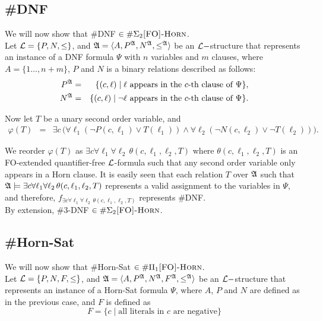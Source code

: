 \subsection{{\sc \#DNF}}
We will now show that {\sc \#DNF} $\in\#\Sigma_2\textsc{[FO]-Horn}$.\\

Let ${\cal L} = \{P,N,\leq\}$, and ${\frak A} = \langle A, P^{\frak A}, N^{\frak A}, \leq^{\frak A} \rangle$ be an ${\cal L}-$structure that represents an instance of a {\sc DNF} formula $\Psi$ with $n$ variables and $m$ clauses, where $A = \{1\ldots,n+m\}$, $P$ and $N$ is a binary relations described as follows:
\begin{eqnarray*}
P^{\frak A} &=& \{(c,\ell)\mid \ell \mbox{ appears in the $c$-th clause of }\Psi\},\\
N^{\frak A} &=& \{(c,\ell)\mid \neg \ell \mbox{ appears in the $c$-th clause of }\Psi\}.
\end{eqnarray*}

Now let $T$ be a unary second order variable, and
\begin{eqnarray*}
\varphi(T) &=& \exists c \,\Big(\forall \ell_1 (\neg P(c,\ell_1) \vee T(\ell_1)) \wedge \forall \ell_2 (\neg N(c,\ell_2) \vee \neg T(\ell_2))\Big). 
\end{eqnarray*}

We reorder $\varphi(T)$ as $\exists c \forall \ell_1 \forall \ell_2\, \theta(c,\ell_1,\ell_2,T)$ where $\theta(c,\ell_1,\ell_2,T)$ is an {\sc FO}-extended quantifier-free ${\cal L}$-formula such that any second order variable only appears in a Horn clause. It is easily seen that each relation $T$ over ${\frak A}$ such that ${\frak A}\models \exists c \forall \ell_1 \forall \ell_2\, \theta(c,\ell_1,\ell_2,T)$ represents a valid assignment to the variables in $\Psi$, and therefore, $f_{\exists c \forall \ell_1 \forall \ell_2\, \theta(c,\ell_1,\ell_2,T)}$ represents {\sc \#DNF}.\\

By extension, {\sc \#3-DNF} $\in\#\Sigma_2\textsc{[FO]-Horn}$.

\subsection{{\sc \#Horn-Sat}}
We will now show that {\sc \#Horn-Sat} $\in\#\Pi_1\textsc{[FO]-Horn}$.\\

Let ${\cal L} = \{P,N,F,\leq\}$, and ${\frak A} = \langle A, P^{\frak A}, N^{\frak A}, F^{\frak A}, \leq^{\frak A} \rangle$ be an ${\cal L}-$structure that represents an instance of a {\sc Horn-Sat} formula $\Psi$, where $A$, $P$ and $N$ are defined as in the previous case, and $F$ is defined as
\[
	F = \{ c \mid
		\mbox{all literals in $c$ are negative}
	\}
\]

